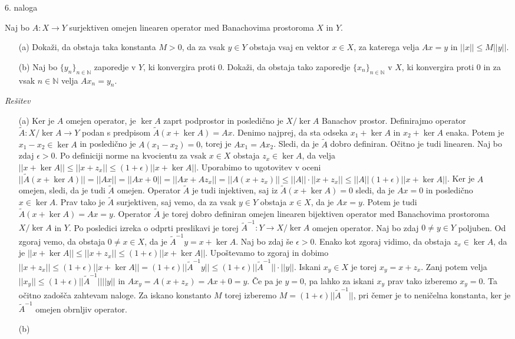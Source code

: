 \documentclass[a4paper, 12pt]{article}
\newcommand{\N}{\mathbb{N}}
\begin{document}
\begin{flushleft}
6. naloga
\end{flushleft}
Naj bo $A:X\rightarrow Y$ surjektiven omejen linearen operator med Banachovima prostoroma $X$ in $Y$.
\begin{enumerate}	
\item[(a)] Dokaži, da obstaja taka konstanta $M> 0$, da za vsak $y\in Y$ obstaja vsaj en vektor $x\in X$, za katerega velja $Ax = y$ in $||x|| \le M ||y||$.
\item[(b)] Naj bo $\{y_n\}_{n\in \N}$ zaporedje v $Y$, ki konvergira proti 0. Dokaži, da obstaja tako zaporedje $\{x_n\}_{n\in \N}$ v $X$, ki konvergira proti 0 in za vsak $n\in \N$ velja $Ax_n = y_n$.
\end{enumerate}
\emph{Rešitev}
\begin{enumerate}
\item[(a)]Ker je $A$ omejen operator, je $\ker A$ zaprt podprostor in posledično je $X/\ker A$ Banachov prostor. Definirajmo operator $\tilde{A}: X/\ker A \rightarrow Y$ podan s predpisom $\tilde{A}(x+\ker A) = Ax$. Denimo najprej, da sta odseka $x_1 + \ker A$ in $x_2 + \ker A$ enaka. Potem je $x_1 - x_2 \in \ker A$ in posledično je $A(x_1 - x_2)=0 $, torej je $Ax_1 = Ax_2$. Sledi, da je $\tilde{A}$ dobro definiran. Očitno je tudi linearen. Naj bo zdaj $\epsilon > 0$. Po definiciji norme na kvocientu za vsak $x \in X$ obstaja $z_x \in \ker A$, da velja $||x+\ker A|| \le ||x+z_x|| \le (1+\epsilon)|| x+\ker A||$. Uporabimo to ugotovitev v oceni $||\tilde{A}(x+\ker A)|| = ||Ax|| = ||Ax + 0|| = ||Ax + Az_x|| = ||A(x+z_x)|| \le ||A|| \cdot ||x+z_x|| \le ||A||(1+\epsilon)||x+\ker A||$. Ker je $A$ omejen, sledi, da je tudi $\tilde{A}$ omejen. Operator $\tilde{A}$ je tudi injektiven, saj iz $\tilde{A}(x+\ker A) = 0$ sledi, da je $Ax=0$ in posledično $x\in \ker A$. Prav tako je $\tilde{A}$ surjektiven, saj vemo, da za vsak $y\in Y$ obstaja $x\in X$, da je $Ax=y$. Potem je tudi $\tilde{A}(x+\ker A) = Ax = y$.
Operator $\tilde{A}$ je torej dobro definiran omejen linearen bijektiven operator med Banachovima prostoroma $X/\ker A$ in $Y$. Po posledici izreka o odprti preslikavi je torej $\tilde{A}^{-1} : Y\rightarrow X/\ker A$ omejen operator.
Naj bo zdaj $0\neq y\in Y$ poljuben. Od zgoraj vemo, da obstaja $0\neq x\in X$, da je $\tilde{A}^{-1} y = x+ \ker A$.
Naj bo zdaj še $\epsilon >0$. Enako kot zgoraj vidimo, da obstaja $z_x \in \ker A$, da je $||x+\ker A|| \le ||x+z_x|| \le (1+\epsilon)||x+\ker A||$. Upoštevamo to zgoraj in dobimo $||x+z_x|| \le (1+\epsilon) ||x+\ker A|| = (1+\epsilon) ||\tilde{A}^{-1}y|| \le (1+\epsilon) ||	\tilde{A}^{-1}|| \cdot ||y||$. Iskani $x_y\in X$ je torej $x_y = x+z_x$. Zanj potem velja $||x_y|| \le (1+\epsilon)||\tilde{A}^{-1}|| ||y||$ in $Ax_y = A(x+z_x) = Ax + 0 = y$. Če pa je $y=0$, pa lahko za iskani $x_y$ prav tako izberemo $x_y = 0$. Ta očitno zadošča zahtevam naloge.  Za iskano konstanto $M$ torej izberemo $M = (1+\epsilon)||\tilde{A}^{-1}||$, pri čemer je to neničelna konstanta, ker je $\tilde{A}^{-1}$ omejen obrnljiv operator.
\item[(b)]
\end{enumerate}
\end{document}
